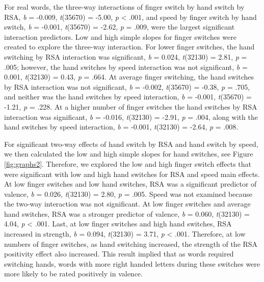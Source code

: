 \documentclass[english,man]{apa6}
\theoremstyle{definition}
\theoremstyle{definition}
\theoremstyle{definition}
\theoremstyle{remark}
\begin{document}
For real words, the three-way interactions of finger switch by hand
switch by RSA, \emph{b} = -0.009, \emph{t}(35670) = -5.00, \emph{p}
\textless{} .001, and speed by finger switch by hand switch, \emph{b} =
-0.001, \emph{t}(35670) = -2.62, \emph{p} = .009, were the largest
significant interaction predictors. Low and high simple slopes for
finger switches were created to explore the three-way interaction. For
lower finger switches, the hand switching by RSA interaction was
significant, \emph{b} = 0.024, \emph{t}(32130) = 2.81, \emph{p} = .005;
however, the hand switches by speed interaction was not significant,
\emph{b} = 0.001, \emph{t}(32130) = 0.43, \emph{p} = .664. At average
finger switching, the hand switches by RSA interaction was not
significant, \emph{b} = -0.002, \emph{t}(35670) = -0.38, \emph{p} =
.705, and neither was the hand switches by speed interaction, \emph{b} =
-0.001, \emph{t}(35670) = -1.21, \emph{p} = .228. At a higher number of
finger switches the hand switches by RSA interaction was significant,
\emph{b} = -0.016, \emph{t}(32130) = -2.91, \emph{p} = .004, along with
the hand switches by speed interaction, \emph{b} = -0.001,
\emph{t}(32130) = -2.64, \emph{p} = .008.

For significant two-way effects of hand switch by RSA and hand switch by
speed, we then calculated the low and high simple slopes for hand
switches, see Figure \ref{fig:graphs2}. Therefore, we explored the low
and high finger switch effects that were significant with low and high
hand switches for RSA and speed main effects. At low finger switches and
low hand switches, RSA was a significant predictor of valence, \emph{b}
= 0.026, \emph{t}(32130) = 2.80, \emph{p} = .005. Speed was not examined
because the two-way interaction was not significant. At low finger
switches and average hand switches, RSA was a stronger predictor of
valence, \emph{b} = 0.060, \emph{t}(32130) = 4.04, \emph{p} \textless{}
.001. Last, at low finger switches and high hand switches, RSA increased
in strength, \emph{b} = 0.094, \emph{t}(32130) = 3.71, \emph{p}
\textless{} .001. Therefore, at low numbers of finger switches, as hand
switching increased, the strength of the RSA positivity effect also
increased. This result implied that as words required switching hands,
words with more right handed letters during these switches were more
likely to be rated positively in valence.
\end{document}
